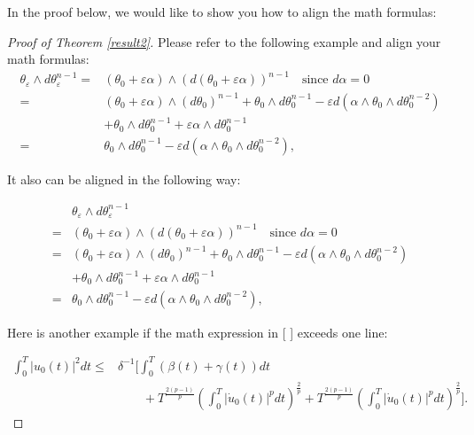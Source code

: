 \documentclass{aims}
\theoremstyle{definition}
\newcommand{\ep}{\varepsilon}
\newcommand{\eps}[1]{{#1}_{\varepsilon}}
\begin{document}
In the proof below, we would like to show you how to align the math
formulas:
\begin{proof}[Proof of Theorem \ref{result2}]
    Please refer to the following example and align your math formulas:
\begin{equation}\label{Multi}
 \begin{split}
    \eps{\theta} \wedge d\eps{\theta}^{n-1} =& (\theta_0 + \ep \alpha)
    \wedge (d(\theta_0 + \ep \alpha))^{n-1} \quad \text{since } d\alpha = 0\\
    =& (\theta_0 + \ep \alpha) \wedge
    (d\theta_0)^{n-1} + \theta_0 \wedge d\theta_0^{n-1} - \ep d(\alpha \wedge
    \theta_0 \wedge d\theta_0^{n-2})\\
    &  + \theta_0 \wedge d\theta_0^{n-1} + \ep \alpha \wedge
    d\theta_0^{n-1}  \\
    =& \theta_0 \wedge d\theta_0^{n-1} - \ep d(\alpha \wedge
    \theta_0 \wedge d\theta_0^{n-2}),
 \end{split}
\end{equation}

It also can be aligned in the following way:

\begin{equation}\label{Multi}
 \begin{split}
    &\eps{\theta} \wedge d\eps{\theta}^{n-1} \\
    =& (\theta_0 + \ep \alpha)
    \wedge (d(\theta_0 + \ep \alpha))^{n-1} \quad \text{since } d\alpha = 0\\
    =& (\theta_0 + \ep \alpha) \wedge
    (d\theta_0)^{n-1} + \theta_0 \wedge d\theta_0^{n-1} - \ep d(\alpha \wedge
    \theta_0 \wedge d\theta_0^{n-2})\\
    &  + \theta_0 \wedge d\theta_0^{n-1} + \ep \alpha \wedge
    d\theta_0^{n-1}  \\
    =& \theta_0 \wedge d\theta_0^{n-1} - \ep d(\alpha \wedge
    \theta_0 \wedge d\theta_0^{n-2}),
 \end{split}
\end{equation}

\newpage

Here is another example if the math expression in [ ] exceeds one
line:

\begin{equation}\label{Equ3}
 \begin{split}
\int_0^T |u_0(t)|^2dt  \leq& \delta^{-1} [\int_0^T
(\beta(t)+\gamma(t)) dt\\
&  \quad\quad+T^{\frac{2(p-1)}{p}}(\int_0^T
|\dot{u}_0(t)|^pdt)^{\frac{2}{p}}
 +T^{\frac{2(p-1)}{p}}(\int_0^T |\dot{u}_0(t)|^pdt)^{\frac{2}{p}}].
 \end{split}
\end{equation}


\end{proof}
\end{document}
